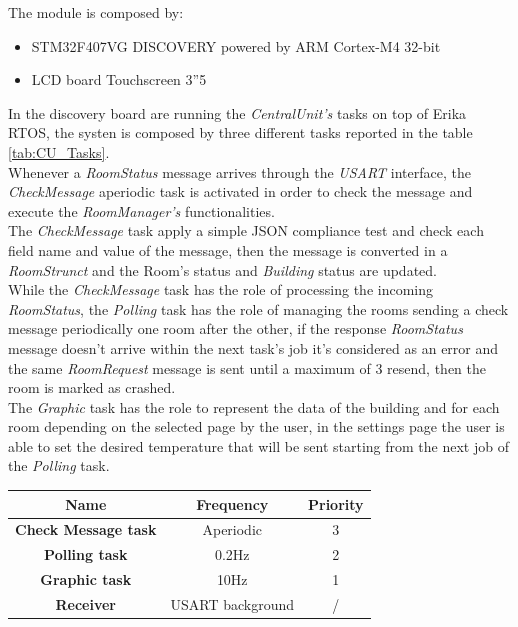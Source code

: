 The module is composed by:
\begin{itemize}
	\item STM32F407VG DISCOVERY powered by ARM Cortex-M4 32-bit
	\item LCD board Touchscreen 3”5
\end{itemize}
In the discovery board are running the \textit{CentralUnit's} tasks on top of Erika RTOS, the systen is composed by three different tasks reported in the table \ref{tab:CU_Tasks}.\\
Whenever a \textit{RoomStatus} message arrives through the \textit{USART} interface, the \textit{CheckMessage} aperiodic task is activated in order to check the message and execute the \textit{RoomManager's} functionalities.\\
The \textit{CheckMessage} task apply a simple JSON compliance test and check each field name and value of the message, then the message is converted in a \textit{RoomStrunct} and the Room's status and \textit{Building} status are updated.\\
While the \textit{CheckMessage} task has the role of processing the incoming \textit{RoomStatus}, the \textit{Polling} task has the role of managing the rooms sending a check message periodically one room after the other, 
if the response \textit{RoomStatus} message doesn't arrive within the next task's job it's considered as an error and the same \textit{RoomRequest} message is sent until a maximum of 3 resend, then the room is marked as crashed.\\
The \textit{Graphic} task has the role to represent the data of the building and for each room depending on the selected page by the user, in the settings page the user is able to set the desired temperature that will be sent starting from the next job of the \textit{Polling} task.\\
\begin{center}
	\begin{tabular}{||c | c | c ||} 
		\hline
		Name 	& Frequency & Priority	\\ 
		\hline
		\textbf{Check Message task}	&	Aperiodic		& 3 	\\ 
		\hline
		\textbf{Polling task}		&	0.2Hz			& 2 	\\ 
		\hline
		\textbf{Graphic task}		&	10Hz			& 1 	\\ 
		\hline
		\textbf{Receiver}			&	USART background		& / 	\\ 
		\hline
	\end{tabular}
	\label{tab:CU_Tasks}
\end{center}

